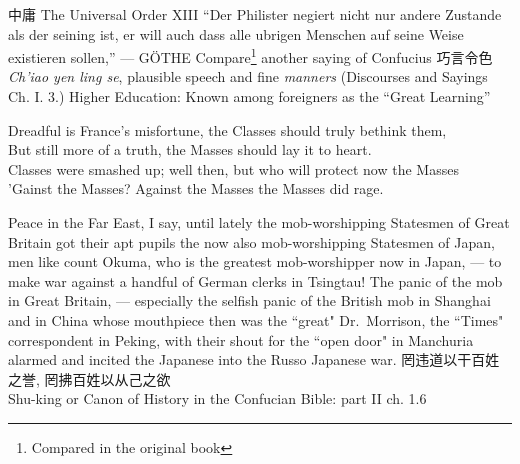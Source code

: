 \begin{thebibliography}{30}
     中庸 The Universal Order XIII
     ``Der Philister negiert nicht nur andere Zustande als der seining ist, er will auch dass alle ubrigen Menschen auf seine Weise existieren sollen,'' --- G\"OTHE
     Compare\footnote{Compared in the original book} another saying of Confucius 巧言令色 \emph{Ch'iao yen ling se}, plausible speech and fine \emph{manners} (Discourses and Sayings Ch. I. 3.)
     Higher Education: Known among foreigners as the ``Great Learning''
     \begin{center}
    Dreadful is France's misfortune, the Classes should truly bethink them, \\
    But still more of a truth, the Masses should lay it to heart.\\
    Classes were smashed up; well then, but who will protect now the Masses\\
    'Gainst the Masses? Against the Masses the Masses did rage. \\
\end{center}
     Peace in the Far East, I say, until lately the mob-worshipping Statesmen of Great Britain got their apt pupils the now also mob-worshipping Statesmen of Japan, men like count Okuma, who is the greatest mob-worshipper now in Japan, --- to make war against a handful of German clerks in Tsingtau!
     The panic of the mob in Great Britain, --- especially the selfish panic of the British mob in Shanghai and in China whose mouthpiece then was the ``great" Dr.~Morrison, the ``Times" correspondent in Peking, with their shout for the ``open door" in Manchuria alarmed and incited the Japanese into the Russo Japanese war.
     罔违道以干百姓之誉, 罔拂百姓以从己之欲 \\ Shu-king or Canon of History in the Confucian Bible: part II ch. 1.6
\end{thebibliography}

